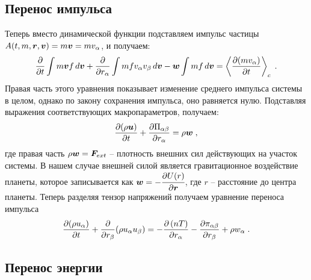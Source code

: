 \subsection{Перенос импульса}

Теперь вместо динамической функции подставляем импульс частицы 
$A(t,m,\bm{r},\bm{v})=m\bm{v}=mv_\alpha$, и получаем:
\begin{equation}
  \frac{\partial}{\partial t}\int m\bm{v} f\,d\bm{v}+\frac{\partial}{\partial r_\alpha}\int mfv_\alpha v_\beta\,d\bm{v}-\bm{w}\int mf\,d\bm{v} = 
  \left\langle\frac{\partial(mv_{\alpha})}{\partial t}\right\rangle_c\;.
\end{equation}
Правая часть этого уравнения показывает изменение среднего импульса системы в целом, однако по закону сохранения импульса,
оно равняется нулю. Подставляя выражения соответствующих макропараметров, получаем:
\begin{equation}
  \frac{\partial(\rho\bm{u})}{\partial t} + \frac{\partial\Pi_{\alpha\beta}}{\partial r_\alpha} = \rho\bm{w}\;,
\end{equation}
где правая часть $\rho\bm{w}=\bm{F}_{ext}$ -- плотность внешних сил действующих на участок системы. В нашем случае
внешней силой является гравитационное воздействие планеты, которое записывается как $\bm{w}=-\cfrac{\partial U(r)}{\partial\bm{r}}$,
где $r$ -- расстояние до центра планеты. Теперь разделяя тензор напряжений получаем уравнение переноса импульса
\begin{equation}
  \frac{\partial(\rho u_\alpha)}{\partial t} + \frac{\partial}{\partial r_\beta}(\rho u_\alpha u_\beta) = 
  -\frac{\partial\left(nT\right)}{\partial r_\alpha} - \frac{\partial\pi_{\alpha\beta}}{\partial r_\beta} + \rho w_\alpha\;.
\end{equation}

\subsection{Перенос энергии}


